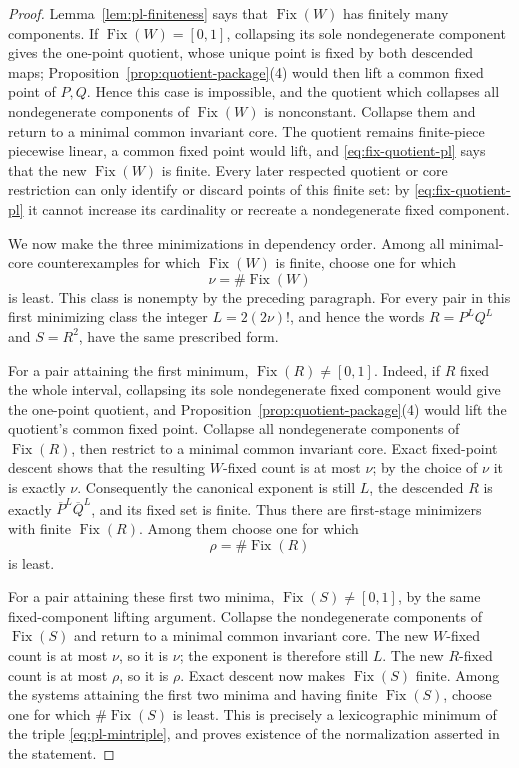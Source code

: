 \documentclass[11pt]{article}
\theoremstyle{definition}
\theoremstyle{remark}
\newcommand{\I}{[0,1]}
\newcommand{\Fix}{\operatorname{Fix}}
\begin{document}
\begin{proof}
Lemma~\ref{lem:pl-finiteness} says that \(\Fix(W)\) has finitely many
components.  If \(\Fix(W)=\I\), collapsing its sole nondegenerate component
gives the one-point quotient, whose unique point is fixed by both descended
maps; Proposition~\ref{prop:quotient-package}(4) would then lift a common
fixed point of \(P,Q\).  Hence this case is impossible, and the quotient
which collapses all nondegenerate components of \(\Fix(W)\) is nonconstant.
Collapse them and return to a minimal common invariant core.  The quotient
remains finite-piece piecewise linear, a common fixed point would lift, and
\eqref{eq:fix-quotient-pl} says that the new \(\Fix(W)\) is finite.
Every later respected quotient or core
restriction can only identify or discard points of this finite set: by
\eqref{eq:fix-quotient-pl} it cannot increase its cardinality or
recreate a nondegenerate fixed component.

We now make the three minimizations in dependency order.  Among all
minimal-core counterexamples for which \(\Fix(W)\) is finite, choose one
for which
\[
 \nu=\#\Fix(W)
\]
is least.  This class is nonempty by the preceding paragraph.  For every
pair in this first minimizing class the integer
\(L=2(2\nu)!\), and hence the words \(R=P^LQ^L\) and \(S=R^2\), have the
same prescribed form.

For a pair attaining the first minimum, \(\Fix(R)\neq\I\).  Indeed, if
\(R\) fixed the whole interval, collapsing its sole nondegenerate fixed
component would give the one-point quotient, and
Proposition~\ref{prop:quotient-package}(4) would lift the quotient's common
fixed point.  Collapse all nondegenerate components of \(\Fix(R)\), then
restrict to a minimal common invariant core.  Exact fixed-point descent
shows that the resulting \(W\)-fixed count is at most \(\nu\); by the choice
of \(\nu\) it is exactly \(\nu\).  Consequently the canonical exponent is
still \(L\), the descended \(R\) is exactly \(\overline P^L\overline Q^L\),
and its fixed set is finite.  Thus there are first-stage minimizers with
finite \(\Fix(R)\).  Among them choose one for which
\[
 \rho=\#\Fix(R)
\]
is least.

For a pair attaining these first two minima, \(\Fix(S)\neq\I\), by the
same fixed-component lifting argument.  Collapse the nondegenerate
components of \(\Fix(S)\) and return to a minimal common invariant core.
The new \(W\)-fixed count is at most \(\nu\), so it is \(\nu\); the exponent
is therefore still \(L\).  The new \(R\)-fixed count is at most \(\rho\),
so it is \(\rho\).  Exact descent now makes \(\Fix(S)\) finite.  Among the
systems attaining the first two minima and having finite \(\Fix(S)\), choose
one for which \(\#\Fix(S)\) is least.  This is precisely a lexicographic
minimum of the triple \eqref{eq:pl-mintriple}, and proves existence of the
normalization asserted in the statement.


\end{proof}
\end{document}
